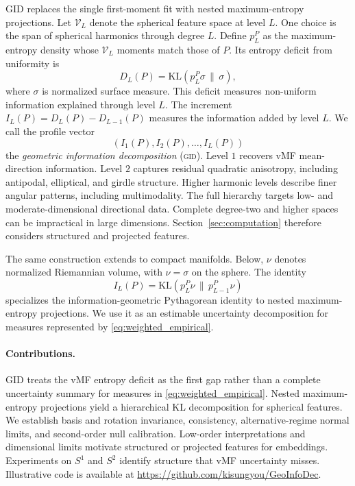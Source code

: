 \documentclass[twoside]{article}
\theoremstyle{definition}
\theoremstyle{remark}
\newcommand{\V}{\mathcal V}
\newcommand{\KL}{\mathrm{KL}}
\newcommand{\GID}{\textsc{gid}\xspace}
\begin{document}
GID replaces the single first-moment fit with nested maximum-entropy projections. Let $\V_L$ denote the spherical feature space at level $L$. One choice is the span of spherical harmonics through degree $L$. Define $p_L^P$ as the maximum-entropy density whose $\V_L$ moments match those of $P$. Its entropy deficit from uniformity is
\[
  D_L(P)=\KL(p_L^P\sigma\,\|\,\sigma),
\]
where $\sigma$ is normalized surface measure. This deficit measures non-uniform information explained through level $L$. The increment
$
  I_L(P)=D_L(P)-D_{L-1}(P)
$
measures the information added by level $L$. We call the profile vector
\begin{equation*}
(I_1(P), I_2(P), \ldots,I_L(P))
\end{equation*}
the \emph{geometric information decomposition} (\GID). Level $1$ recovers vMF mean-direction information. Level $2$ captures residual quadratic anisotropy, including antipodal, elliptical, and girdle structure. Higher harmonic levels describe finer angular patterns, including multimodality. The full hierarchy targets low- and moderate-dimensional directional data. Complete degree-two and higher spaces can be impractical in large dimensions. Section~\ref{sec:computation} therefore considers structured and projected features.


The same construction extends to compact manifolds. Below, $\nu$ denotes normalized Riemannian volume, with $\nu=\sigma$ on the sphere. The identity
\[
  I_L(P)=\KL(p_L^P\nu\,\|\,p_{L-1}^P\nu)
\]
specializes the information-geometric Pythagorean identity to nested maximum-entropy projections. We use it as an estimable uncertainty decomposition for measures represented by \eqref{eq:weighted_empirical}.

\paragraph{Contributions.}
GID treats the vMF entropy deficit as the first gap rather than a complete uncertainty summary for measures in \eqref{eq:weighted_empirical}. Nested maximum-entropy projections yield a hierarchical KL decomposition for spherical features. We establish basis and rotation invariance, consistency, alternative-regime normal limits, and second-order null calibration. Low-order interpretations and dimensional limits motivate structured or projected features for embeddings. Experiments on $S^1$ and $S^2$ identify structure that vMF uncertainty misses. Illustrative code is available at \url{https://github.com/kisungyou/GeoInfoDec}.
\end{document}
